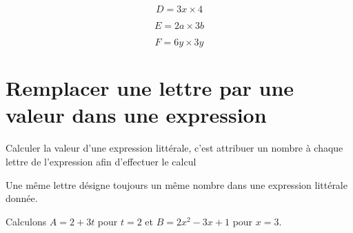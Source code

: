 \documentclass[a4paper,10pt]{report}
\begin{document}
\begin{meth}

\noindent \begin{minipage}{5cm}
$$D = 3x \times 4$$

\noindent\grandscarreaux{\linewidth}{2.4cm}
\end{minipage}
\hspace{5mm}
\begin{minipage}{5cm}
$$E = 2a \times 3b$$

\noindent\grandscarreaux{\linewidth}{2.4cm}
\end{minipage}
\hspace{5mm}
\begin{minipage}{5cm}
$$F = 6y \times 3y$$

\noindent\grandscarreaux{\linewidth}{2.4cm}
\end{minipage}
\end{meth}

\section{Remplacer une lettre par une valeur dans une expression}

\begin{defn}
Calculer la valeur d'une expression littérale, c'est attribuer un nombre à chaque lettre de l'expression afin d'effectuer le calcul
\end{defn}

\begin{rem}

\vspace{-4mm} \hspace{3cm} Une même lettre désigne toujours un même nombre dans une expression littérale donnée.
\end{rem}

\begin{ex}

\vspace{-5mm} \hspace{3cm} Calculons \quad $A = 2 + 3t$ pour $t = 2$ \quad et  \quad $B=2x^2-3x+1$ pour $x=3$.

\vspace{1mm}
\noindent\grandscarreaux{\linewidth}{3.2cm}
\end{ex}
\end{document}
